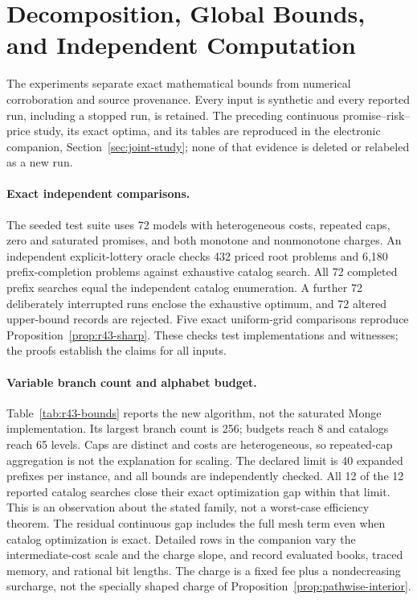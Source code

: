 \section{Decomposition, Global Bounds, and Independent Computation}\label{sec:r43-study}
The experiments separate exact mathematical bounds from numerical corroboration and source provenance. Every input is synthetic and every reported run, including a stopped run, is retained. The preceding continuous promise--risk--price study, its exact optima, and its tables are reproduced in the electronic companion, Section~\ref{sec:joint-study}; none of that evidence is deleted or relabeled as a new run.

\paragraph{Exact independent comparisons.}
The seeded test suite uses 72 models with heterogeneous costs, repeated caps, zero and saturated promises, and both monotone and nonmonotone charges. An independent explicit-lottery oracle checks 432 priced root problems and 6,180 prefix-completion problems against exhaustive catalog search. All 72 completed prefix searches equal the independent catalog enumeration. A further 72 deliberately interrupted runs enclose the exhaustive optimum, and 72 altered upper-bound records are rejected. Five exact uniform-grid comparisons reproduce Proposition~\ref{prop:r43-sharp}. These checks test implementations and witnesses; the proofs establish the claims for all inputs.

\paragraph{Variable branch count and alphabet budget.}
Table~\ref{tab:r43-bounds} reports the new algorithm, not the saturated Monge implementation. Its largest branch count is 256; budgets reach 8 and catalogs reach 65 levels. Caps are distinct and costs are heterogeneous, so repeated-cap aggregation is not the explanation for scaling. The declared limit is 40 expanded prefixes per instance, and all bounds are independently checked. All 12 of the 12 reported catalog searches close their exact optimization gap within that limit. This is an observation about the stated family, not a worst-case efficiency theorem. The residual continuous gap includes the full mesh term even when catalog optimization is exact. Detailed rows in the companion vary the intermediate-cost scale and the charge slope, and record evaluated books, traced memory, and rational bit lengths. The charge is a fixed fee plus a nondecreasing surcharge, not the specially shaped charge of Proposition~\ref{prop:pathwise-interior}.

